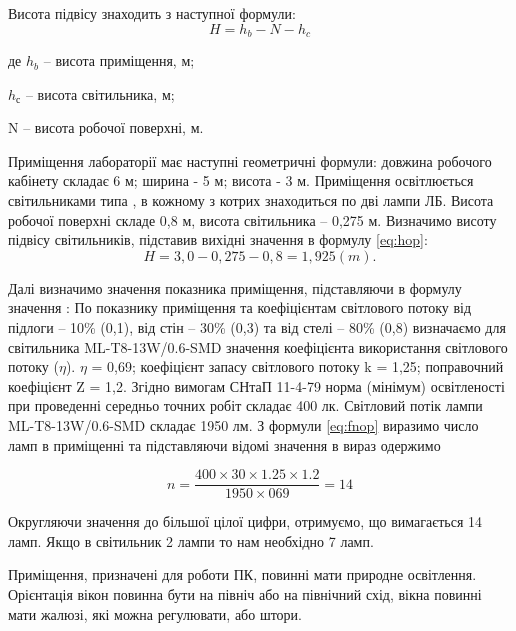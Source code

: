 \documentclass[ukrainian,utf8,simple,floatsubsection, hpadding=5mm,equationsubsection,]{eskdtext}
\begin{document}
Висота підвісу знаходить з наступної формули:
\begin{equation}
\label{eq:hop}
 H =h_{b} - N - h_{c} 
\end{equation}   
\begin{ESKDexplanation}
\item де $h_{b}$ – висота приміщення, м;
\item $h_{с}$ – висота світильника, м;
\item N – висота робочої поверхні, м.
\end{ESKDexplanation}
Приміщення лабораторії має наступні геометричні формули: довжина робочого кабінету складає 6 м;
ширина - 5 м; висота - 3 м.
Приміщення освітлюється світильниками типа , в кожному з котрих знаходиться по дві лампи ЛБ. 
Висота робочої поверхні складе 0,8 м, висота світильника – 0,275 м.
Визначимо висоту підвісу світильників, підставив вихідні значення в формулу \ref{eq:hop}:
\begin{equation}
 H =   3,0 - 0,275 - 0,8 = 1,925(m).
\end{equation}            

Далі визначимо значення показника приміщення, підставляючи в формулу значення :       
По показнику приміщення та коефіцієнтам світлового потоку від підлоги – 10\% (0,1), від стін – 30\% (0,3) та від стелі – 80\% (0,8)
визначаємо для світильника ML-T8-13W/0.6-SMD значення коефіцієнта використання світлового потоку ($\eta$). $\eta$ = 0,69; 
коефіцієнт запасу світлового потоку k = 1,25; поправочний коефіцієнт Z = 1,2.
Згідно вимогам СНтаП 11-4-79 норма (мінімум) освітленості при проведенні середньо точних робіт складає 400 лк.
Світловий потік лампи ML-T8-13W/0.6-SMD складає 1950 лм.
З формули \ref{eq:fnop} виразимо число ламп в приміщенні та підставляючи відомі значення в вираз одержимо
 
\begin{equation}
 n = \frac{400 \times 30 \times 1.25 \times 1.2 }{1950 \times 069} = 14
\end{equation}

Округляючи значення до більшої цілої цифри, отримуємо, що вимагається 14 ламп. Якщо в світильник 2 лампи то нам необхідно
7 ламп.

 Приміщення, призначені для роботи ПК, повинні мати природне освітлення. Орієнтація вікон повинна бути на північ або на північний схід, вікна повинні мати жалюзі, які можна регулювати, або штори.
\end{document}
